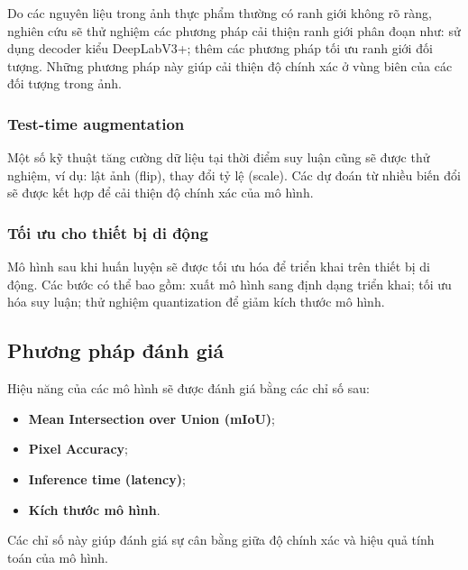 Do các nguyên liệu trong ảnh thực phẩm thường có ranh giới không rõ ràng, nghiên cứu sẽ thử nghiệm các phương pháp cải thiện ranh giới phân đoạn như: sử dụng decoder kiểu DeepLabV3+; thêm các phương pháp tối ưu ranh giới đối tượng. Những phương pháp này giúp cải thiện độ chính xác ở vùng biên của các đối tượng trong ảnh.

\subsubsection{Test-time augmentation}

Một số kỹ thuật tăng cường dữ liệu tại thời điểm suy luận cũng sẽ được thử nghiệm, ví dụ: lật ảnh (flip), thay đổi tỷ lệ (scale). Các dự đoán từ nhiều biến đổi sẽ được kết hợp để cải thiện độ chính xác của mô hình.

\subsubsection{Tối ưu cho thiết bị di động}

Mô hình sau khi huấn luyện sẽ được tối ưu hóa để triển khai trên thiết bị di động. Các bước có thể bao gồm: xuất mô hình sang định dạng triển khai; tối ưu hóa suy luận; thử nghiệm quantization để giảm kích thước mô hình.

\subsection{Phương pháp đánh giá}

Hiệu năng của các mô hình sẽ được đánh giá bằng các chỉ số sau:
\begin{itemize}
    \item \textbf{Mean Intersection over Union (mIoU)};
    \item \textbf{Pixel Accuracy};
    \item \textbf{Inference time (latency)};
    \item \textbf{Kích thước mô hình}.
\end{itemize}
Các chỉ số này giúp đánh giá sự cân bằng giữa độ chính xác và hiệu quả tính toán của mô hình.
